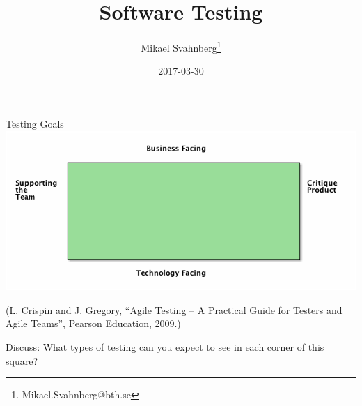 \documentclass[10pt,t,a4paper]{beamer}
\author{Mikael Svahnberg\thanks{Mikael.Svahnberg@bth.se}}
\date{2017-03-30}
\title{Software Testing}
\begin{document}
\maketitle

\begin{frame}[label=sec-1]{Testing Goals}
\includegraphics[width=.9\linewidth]{./FTestQuadrants1.png}

{\tiny
(L. Crispin and J. Gregory, ``Agile Testing -- A Practical Guide for Testers and Agile Teams'', Pearson Education, 2009.)
}

\alert{Discuss:} What types of testing can you expect to see in each corner of this square?
\end{frame}
\end{document}
